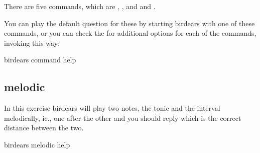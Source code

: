 \documentclass[letterpaper,10pt,english]{sphinxmanual}
\begin{document}
There are five commands, which are , ,  and
 and .

You can play the default question for these by starting birdears with one of
these commands, or you can check the  for additional options for each
of the commands, invoking this way:

\begin{sphinxVerbatim}[commandchars=\\\{\}]
birdears \PYGZlt{}command\PYGZgt{} \PYGZhy{}\PYGZhy{}help
\end{sphinxVerbatim}


\subsection{melodic}
\label{\detokenize{index:melodic}}
In this exercise birdears will play two notes, the tonic and the interval
melodically, ie., one after the other and you should reply which is the
correct distance between the two.

\begin{sphinxVerbatim}[commandchars=\\\{\}]
birdears melodic \PYGZhy{}\PYGZhy{}help
\end{sphinxVerbatim}
\end{document}
